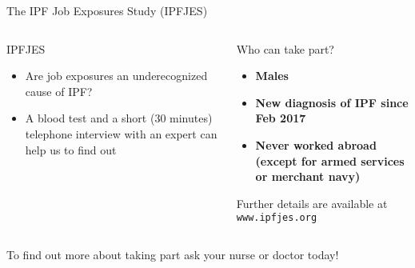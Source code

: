 \documentclass{beamer}
\begin{document}
\begin{frame}[fragile]{The IPF Job Exposures Study (IPFJES)}
\begin{columns}[t]
\begin{column}{0.6\textwidth}
IPFJES
\begin{itemize}
\item Are job exposures an underecognized cause of IPF? 
\item A blood test and a short (30 minutes) telephone interview with an expert can help us to find out 
\end{itemize}
\end{column}
\begin{column}{0.6\textwidth}
Who can take part?
\begin{itemize}
\item \bfseries{Males}
\item \bfseries{New diagnosis of IPF since Feb 2017}
\item \bfseries{Never worked abroad (except for armed services or merchant navy)}
\end{itemize}
Further details are available at  \verb|www.ipfjes.org|
\end{column}
\end{columns}
\begin{center}
To find out more about taking part ask your nurse or doctor today!
\end{center}
\end{frame}
\end{document}
